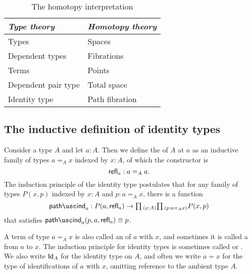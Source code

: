 \begin{table}
\begin{center}
\caption{\label{tab:homotopy_interpretation}The homotopy interpretation}
\begin{tabular}{ll}
\toprule
\emph{Type theory} &  \emph{Homotopy theory} \\
\midrule
Types  & Spaces \\
Dependent types & Fibrations \\
Terms & Points \\
Dependent pair type & Total space \\
Identity type & Path fibration\\
\bottomrule
\end{tabular}
\end{center}
\end{table}

\subsection{The inductive definition of identity types}

\begin{defn}
  Consider a type $A$ and let $a:A$. Then we define the  of $A$ at $a$ as an inductive family of types $a =_A x$ indexed by $x:A$, of which the constructor is
  \begin{equation*}
    \mathsf{refl}_{a}:a=_Aa.
  \end{equation*}
  The induction principle of the identity type postulates that for any family of types $P(x,p)$ indexed by $x:A$ and $p:a=_A x$, there is a function
  \begin{equation*}
    \pathind_a:P(a,\refl{a}) \to \prd{x:A}{p:a=_A x} P(x,p)
  \end{equation*}
  that satisfies $\pathind_a(p,a,\refl{a})\jdeq p$.

  A term of type $a=_A x$ is also called an  of $a$ with $x$, and sometimes it is called a  from $a$ to $x$.
The induction principle for identity types is sometimes called  or . We also write $\mathsf{Id}_{A}$ for the identity type on $A$, and often we write $a=x$ for the type of identifications of $a$ with $x$, omitting reference to the ambient type $A$.
\end{defn}

